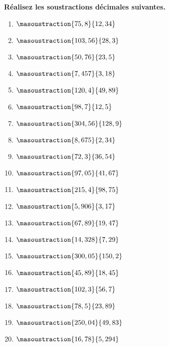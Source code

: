 \documentclass[11pt]{article}
\begin{document}
\begin{exercice}
\textbf{Réalisez les soustractions décimales suivantes.}
  \begin{multicols}{3}
    \begin{enumerate}
    \item $\masoustraction{75,8}{12,34}$
    \item $\masoustraction{103,56}{28,3}$
    \item $\masoustraction{50,76}{23,5}$
    \item $\masoustraction{7,457}{3,18}$
    \item $\masoustraction{120,4}{49,89}$
    \item $\masoustraction{98,7}{12,5}$
    \item $\masoustraction{304,56}{128,9}$
    \item $\masoustraction{8,675}{2,34}$
    \item $\masoustraction{72,3}{36,54}$
    \item $\masoustraction{97,05}{41,67}$
    \item $\masoustraction{215,4}{98,75}$
    \item $\masoustraction{5,906}{3,17}$
    \item $\masoustraction{67,89}{19,47}$
    \item $\masoustraction{14,328}{7,29}$
    \item $\masoustraction{300,05}{150,2}$
    \item $\masoustraction{45,89}{18,45}$
    \item $\masoustraction{102,3}{56,7}$
    \item $\masoustraction{78,5}{23,89}$
    \item $\masoustraction{250,04}{49,83}$
    \item $\masoustraction{16,78}{5,294}$
    \end{enumerate}
  \end{multicols}
\end{exercice}
\end{document}
